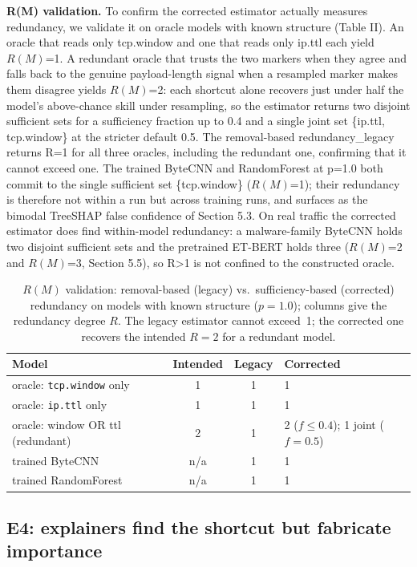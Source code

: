 \documentclass[journal]{IEEEtran}
\begin{document}
\textbf{R(M) validation.} To confirm the corrected estimator actually
measures redundancy, we validate it on oracle models with known
structure (Table II). An oracle that reads only tcp.window and one that
reads only ip.ttl each yield $R(M)$=1. A redundant oracle that trusts the
two markers when they agree and falls back to the genuine payload-length
signal when a resampled marker makes them disagree yields $R(M)$=2: each
shortcut alone recovers just under half the model's above-chance skill
under resampling, so the estimator returns two disjoint sufficient sets
for a sufficiency fraction up to 0.4 and a single joint set \{ip.ttl,
tcp.window\} at the stricter default 0.5. The removal-based
redundancy\_legacy returns R=1 for all three oracles, including the
redundant one, confirming that it cannot exceed one. The trained ByteCNN
and RandomForest at p=1.0 both commit to the single sufficient set
\{tcp.window\} ($R(M)$=1); their redundancy is therefore not within a run
but across training runs, and surfaces as the bimodal TreeSHAP false
confidence of Section 5.3. On real traffic the corrected estimator does
find within-model redundancy: a malware-family ByteCNN holds two
disjoint sufficient sets and the pretrained ET-BERT holds three ($R(M)$=2
and $R(M)$=3, Section 5.5), so R\textgreater1 is not confined to the
constructed oracle.

\begin{table}[!t]
\centering
\caption{$R(M)$ validation: removal-based (legacy) vs.\ sufficiency-based (corrected) redundancy on models with known structure ($p{=}1.0$); columns give the redundancy degree $R$. The legacy estimator cannot exceed~1; the corrected one recovers the intended $R{=}2$ for a redundant model.}
\label{tab:rm}
\small
\setlength{\tabcolsep}{4pt}
\begin{tabular}{@{}p{2.35cm}ccp{2.15cm}@{}}
\toprule
Model & Intended & Legacy & Corrected \\
\midrule
oracle: \texttt{tcp.window} only & 1 & 1 & 1 \\
oracle: \texttt{ip.ttl} only & 1 & 1 & 1 \\
oracle: window OR ttl (redundant) & 2 & 1 & 2 ($f{\leq}0.4$); 1 joint ($f{=}0.5$) \\
trained ByteCNN & n/a & 1 & 1 \\
trained RandomForest & n/a & 1 & 1 \\
\bottomrule
\end{tabular}
\end{table}

\subsection{E4: explainers find the shortcut but fabricate importance}
\end{document}
